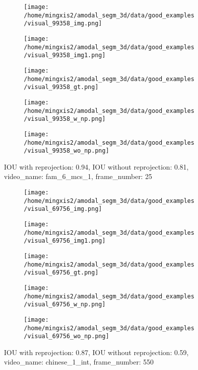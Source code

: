 \begin{figure}
\centering
\begin{subfigure}[t]{0.19\textwidth}
\centering
\texttt{[image: /home/mingxis2/amodal\_segm\_3d/data/good\_examples/visual\_99358\_img.png]}
\end{subfigure}
\begin{subfigure}[t]{0.19\textwidth}
\centering
\texttt{[image: /home/mingxis2/amodal\_segm\_3d/data/good\_examples/visual\_99358\_img1.png]}
\end{subfigure}
\begin{subfigure}[t]{0.19\textwidth}
\centering
\texttt{[image: /home/mingxis2/amodal\_segm\_3d/data/good\_examples/visual\_99358\_gt.png]}
\end{subfigure}
\begin{subfigure}[t]{0.19\textwidth}
\centering
\texttt{[image: /home/mingxis2/amodal\_segm\_3d/data/good\_examples/visual\_99358\_w\_np.png]}
\end{subfigure}
\begin{subfigure}[t]{0.19\textwidth}
\centering
\texttt{[image: /home/mingxis2/amodal\_segm\_3d/data/good\_examples/visual\_99358\_wo\_np.png]}
\end{subfigure}
\caption{IOU with reprojection: 0.94, IOU without reprojection: 0.81, video\_name: fam\_6\_mcs\_1, frame\_number: 25}
\end{figure}

\begin{figure}
\centering
\begin{subfigure}[t]{0.19\textwidth}
\centering
\texttt{[image: /home/mingxis2/amodal\_segm\_3d/data/good\_examples/visual\_69756\_img.png]}
\end{subfigure}
\begin{subfigure}[t]{0.19\textwidth}
\centering
\texttt{[image: /home/mingxis2/amodal\_segm\_3d/data/good\_examples/visual\_69756\_img1.png]}
\end{subfigure}
\begin{subfigure}[t]{0.19\textwidth}
\centering
\texttt{[image: /home/mingxis2/amodal\_segm\_3d/data/good\_examples/visual\_69756\_gt.png]}
\end{subfigure}
\begin{subfigure}[t]{0.19\textwidth}
\centering
\texttt{[image: /home/mingxis2/amodal\_segm\_3d/data/good\_examples/visual\_69756\_w\_np.png]}
\end{subfigure}
\begin{subfigure}[t]{0.19\textwidth}
\centering
\texttt{[image: /home/mingxis2/amodal\_segm\_3d/data/good\_examples/visual\_69756\_wo\_np.png]}
\end{subfigure}
\caption{IOU with reprojection: 0.87, IOU without reprojection: 0.59, video\_name: chinese\_1\_int, frame\_number: 550}
\end{figure}

